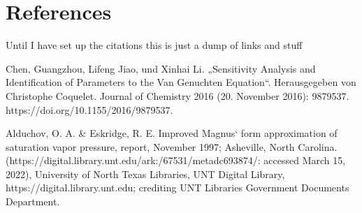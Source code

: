 \section{References}
Until I have set up the citations this is just a dump of links and stuff

Chen, Guangzhou, Lifeng Jiao, und Xinhai Li. „Sensitivity Analysis and Identification of Parameters to the Van Genuchten Equation“. Herausgegeben von Christophe Coquelet. Journal of Chemistry 2016 (20. November 2016): 9879537. https://doi.org/10.1155/2016/9879537.

 Alduchov, O. A. & Eskridge, R. E. Improved Magnus` form approximation of saturation vapor pressure, report, November 1997; Asheville, North Carolina. (https://digital.library.unt.edu/ark:/67531/metadc693874/: accessed March 15, 2022), University of North Texas Libraries, UNT Digital Library, https://digital.library.unt.edu; crediting UNT Libraries Government Documents Department. 
